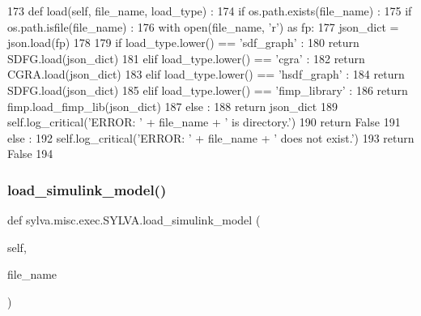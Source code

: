 \begin{DoxyCode}
173   \textcolor{keyword}{def }load(self, file\_name, load\_type) :
174     \textcolor{keywordflow}{if} os.path.exists(file\_name) :
175       \textcolor{keywordflow}{if} os.path.isfile(file\_name) :
176         with open(file\_name, \textcolor{stringliteral}{'r') as fp:}
177 \textcolor{stringliteral}{          json\_dict = json.load(fp)}
178 \textcolor{stringliteral}{}
179 \textcolor{stringliteral}{        }\textcolor{keywordflow}{if} load\_type.lower() == \textcolor{stringliteral}{'sdf\_graph'} :
180           \textcolor{keywordflow}{return} SDFG.load(json\_dict)
181         \textcolor{keywordflow}{elif} load\_type.lower() == \textcolor{stringliteral}{'cgra'} :
182           \textcolor{keywordflow}{return} CGRA.load(json\_dict)
183         \textcolor{keywordflow}{elif} load\_type.lower() == \textcolor{stringliteral}{'hsdf\_graph'} :
184           \textcolor{keywordflow}{return} SDFG.load(json\_dict)
185         \textcolor{keywordflow}{elif} load\_type.lower() == \textcolor{stringliteral}{'fimp\_library'} :
186           \textcolor{keywordflow}{return} fimp.load\_fimp\_lib(json\_dict)
187         \textcolor{keywordflow}{else} :
188           \textcolor{keywordflow}{return} json\_dict
189       self.log\_critical(\textcolor{stringliteral}{'ERROR: '} + file\_name + \textcolor{stringliteral}{' is directory.'})
190       \textcolor{keywordflow}{return} \textcolor{keyword}{False}
191     \textcolor{keywordflow}{else} :
192       self.log\_critical(\textcolor{stringliteral}{'ERROR: '} + file\_name + \textcolor{stringliteral}{' does not exist.'})
193       \textcolor{keywordflow}{return} \textcolor{keyword}{False}
194 
\end{DoxyCode}
\mbox{\label{classsylva_1_1misc_1_1exec_1_1_s_y_l_v_a_a9b8d4f144cb6e5feedd40761fdc3394f}} 
\subsubsection{\texorpdfstring{load\+\_\+simulink\+\_\+model()}{load\_simulink\_model()}}
{\footnotesize\ttfamily def sylva.\+misc.\+exec.\+S\+Y\+L\+V\+A.\+load\+\_\+simulink\+\_\+model (\begin{DoxyParamCaption}\item[{}]{self,  }\item[{}]{file\+\_\+name }\end{DoxyParamCaption})}



